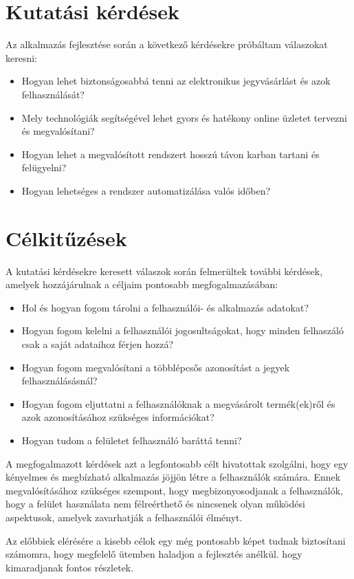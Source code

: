 \section {Kutatási kérdések}

Az alkalmazás fejlesztése során a következő kérdésekre próbáltam válaszokat keresni:
\begin{itemize}
	\item Hogyan lehet biztonságosabbá tenni az elektronikus jegyvásárlást és azok felhasználását?
	\item Mely technológiák segítségével lehet gyors és hatékony online üzletet tervezni és megvalósítani?
	\item Hogyan lehet a megvalósított rendszert hosszú távon karban tartani és felügyelni?
	\item Hogyan lehetséges a rendszer automatizálása valós időben?
\end{itemize}

\section {Célkitűzések}

A kutatási kérdésekre keresett válaszok során felmerültek további kérdések, amelyek hozzájárulnak a céljaim pontosabb megfogalmazásában:
\begin{itemize}
	\item Hol és hogyan fogom tárolni a felhasználói- és alkalmazás adatokat?
	\item Hogyan fogom kelelni a felhasználói jogosultságokat, hogy minden felhaszáló csak a saját adataihoz férjen hozzá?
	\item Hogyan fogom megvalósítani a többlépcsős azonosítást a jegyek felhasználásásnál?
	\item Hogyan fogom eljuttatni a felhasználóknak a megvásárolt termék(ek)ről és azok azonosításához szükséges információkat? 
	\item Hogyan tudom a felületet felhasználó baráttá tenni?
\end{itemize}

A megfogalmazott kérdések azt a legfontosabb célt hivatottak szolgálni, hogy egy kényelmes és megbízható alkalmazás jöjjön létre a felhasználók számára. Ennek megvalósításához szükséges szempont, hogy megbizonyosodjanak a felhasználók, hogy a felület használata nem félreérthető és nincsenek olyan működési aspektusok, amelyek zavarhatják a felhasználói élményt.

Az előbbiek elérésére a kisebb célok egy még pontosabb képet tudnak biztosítani számomra, hogy megfelelő ütemben haladjon a fejlesztés anélkül. hogy kimaradjanak fontos részletek.

